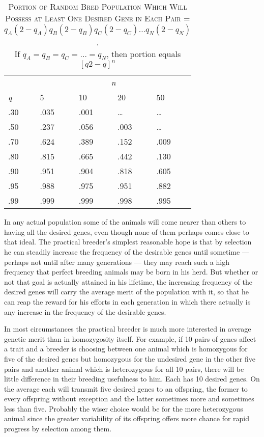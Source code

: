 \begin{table}[htbp]
	\centering
	\caption{\textsc{Portion of Random Bred Population Which Will Possess at Least One
	Desired Gene in Each Pair =} $q_A(2-q_A)q_B(2-q_B)q_C(2-q_C) \ldots q_N(2-q_N)$.\\
	If $q_A = q_B = q_C = \ldots = q_N$, then portion equals $[q{2-q}]^n$}
	\label{tbl:Lush_Table_4}
	\begin{tabular}{C{2cm}|C{2cm}|C{2cm}|C{2cm}|C{2cm}}
		\hline
		\hline
					&  \\
		\textit{q}	& 5			& 10		& 20		& 50 \\
 		\hline
		.30			& .035		& .001		& \ldots	& \ldots \\
		.50			& .237		& .056		& .003		& \ldots \\
		.70			& .624		& .389		& .152		& .009 \\
		.80			& .815		& .665		& .442		& .130 \\
		.90			& .951		& .904		& .818		& .605 \\
		.95			& .988		& .975		& .951		& .882 \\
		.99			& .999		& .999		& .998		& .995 \\
 		\hline
	\end{tabular}
\end{table}

In any actual population some of the animals will come nearer than
others to having all the desired genes, even though none of them perhaps
comes close to that ideal. The practical breeder's simplest reasonable
hope is that by selection he can steadily increase the frequency of
the desirable genes until sometime --- perhaps not until after many
generations --- they may reach such a high frequency that perfect breeding
animals may be born in his herd. But whether or not that goal is actually
attained in his lifetime, the increasing frequency of the desired genes
will carry the average merit of the population with it, so that he can
reap the reward for his efforts in each generation in which there actually
is any increase in the frequency of the desirable genes.

In most circumstances the practical breeder is much more interested
in average genetic merit than in homozygosity itself. For example, if
10 pairs of genes affect a trait and a breeder is choosing between one
animal which is homozygous for five of the desired genes but homozygous
for the undesired gene in the other five pairs and another animal
which is heterozygous for all 10 pairs, there will be little difference in
their breeding usefulness to him. Each has 10 desired genes. On the
average each will transmit five desired genes to an offspring, the former
to every offspring without exception and the latter sometimes more and
sometimes less than five. Probably the wiser choice would be for the
more heterozygous animal since the greater variability of its offspring
offers more chance for rapid progress by selection among them.


